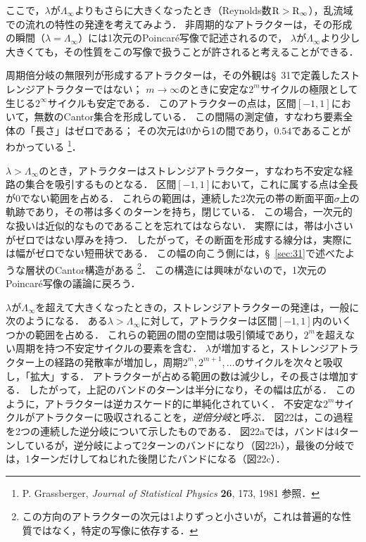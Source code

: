 ここで，$\lambda$が$\Lambda_\infty$よりもさらに大きくなったとき（Reynolds数$\mathrm{R}>\mathrm{R}_\infty$），乱流域での流れの特性の発達を考えてみよう．
非周期的なアトラクターは，その形成の瞬間（$\lambda=\Lambda_\infty$）には1次元のPoincar\'{e}写像で記述されるので，
$\lambda$が$\Lambda_\infty$より少し大きくても，その性質をこの写像で扱うことが許されると考えることができる．




周期倍分岐の無限列が形成するアトラクターは，その外観は\S~31で定義したストレンジアトラクターではない；
$m\to\infty$のときに安定な$2^m$サイクルの極限として生じる$2^\infty$サイクルも安定である．
このアトラクターの点は，区間$[-1,1]$において，無数のCantor集合を形成している．
この間隔の測定値，すなわち要素全体の「長さ」はゼロである；
その次元は0から1の間であり，$0.54$であることがわかっている
\footnote{P. Grassberger, \textit{Journal of Statistical Physics} \textbf{26}, 173, 1981
参照．}．




$\lambda>\Lambda_\infty$のとき，アトラクターはストレンジアトラクター，すなわち不安定な経路の集合を吸引するものとなる．
区間$[-1,1]$において，これに属する点は全長が0でない範囲を占める．
これらの範囲は，連続した2次元の帯の断面平面$\sigma$上の軌跡であり，その帯は多くのターンを持ち，閉じている．
この場合，一次元的な扱いは近似的なものであることを忘れてはならない．
実際には，帯は小さいがゼロではない厚みを持つ．
したがって，その断面を形成する線分は，実際には幅がゼロでない短冊状である．
この幅の向こう側には，\S~\ref{sec:31}で述べたような層状のCantor構造がある
\footnote{この方向のアトラクターの次元は1よりずっと小さいが，これは普遍的な性質ではなく，特定の写像に依存する．}．
この構造には興味がないので，1次元のPoincar\'{e}写像の議論に戻ろう．




$\lambda$が$\Lambda_\infty$を超えて大きくなったときの，ストレンジアトラクターの発達は，一般に次のようになる．
ある$\lambda>\Lambda_\infty$に対して，アトラクターは区間$[-1,1]$内のいくつかの範囲を占める．
これらの範囲の間の空間は吸引領域であり，$2^m$を超えない周期を持つ不安定サイクルの要素を含む．
$\lambda$が増加すると，ストレンジアトラクター上の経路の発散率が増加し，周期$2^m, 2^{m+1}, \ldots$のサイクルを次々と吸収し，「拡大」する．
アトラクターが占める範囲の数は減少し，その長さは増加する．
したがって，上記のバンドのターンは半分になり，その幅は広がる．
このように，アトラクターは逆カスケード的に単純化されていく．
不安定な$2^m$サイクルがアトラクターに吸収されることを，\emph{逆倍分岐}と呼ぶ．
図22は，この過程を2つの連続した逆分岐について示したものである．
図22aでは，バンドは4ターンしているが，逆分岐によって2ターンのバンドになり（図22b），最後の分岐では，1ターンだけしてねじれた後閉じたバンドになる（図22c）．





